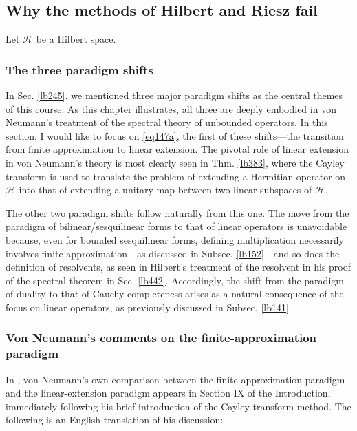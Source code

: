 \documentclass[12pt,b5paper,notitlepage]{article}
\theoremstyle{definition}
\theoremstyle{plain}
\newcommand{\MH}{\mathcal H}
\numberwithin{equation}{section}
\begin{document}
\subsection{Why the methods of Hilbert and Riesz fail}

Let $\MH$ be a Hilbert space.

\subsubsection{The three paradigm shifts}


In Sec. \ref{lb245}, we mentioned three major paradigm shifts as the central themes of this course. As this chapter illustrates, all three are deeply embodied in von Neumann's treatment of the spectral theory of unbounded operators. In this section, I would like to focus on \eqref{eq147a}, the first of these shifts---the transition from finite approximation to linear extension. The pivotal role of linear extension in von Neumann's theory is most clearly seen in Thm. \ref{lb383}, where the Cayley transform is used to translate the problem of extending a Hermitian operator on $\MH$ into that of extending a unitary map between two linear subspaces of $\MH$.

The other two paradigm shifts follow naturally from this one. The move from the paradigm of bilinear/sesquilinear forms to that of linear operators is unavoidable because, even for bounded sesquilinear forms, defining multiplication necessarily involves finite approximation---as discussed in Subsec. \ref{lb152}---and so does the definition of resolvents, as seen in Hilbert’s treatment of the resolvent in his proof of the spectral theorem in Sec. \ref{lb442}. Accordingly, the shift from the paradigm of duality to that of Cauchy completeness arises as a natural consequence of the focus on linear operators, as previously discussed in Subsec. \ref{lb141}.



\subsubsection{Von Neumann's comments on the finite-approximation paradigm}\label{lb443}

In \cite{vN29a}, von Neumann's own comparison between the finite-approximation paradigm and the linear-extension paradigm appears in Section IX of the Introduction, immediately following his brief introduction of the Cayley transform method. The following is an English translation of his discussion:
\end{document}
